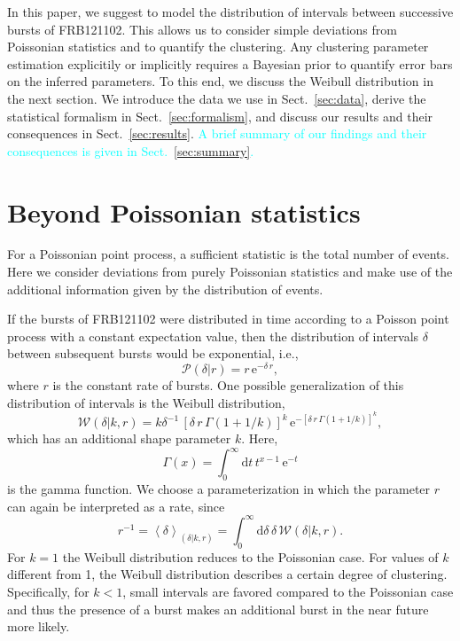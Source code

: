 \documentclass[fleqn,usenatbib]{mnras}
\newcommand{\new}[1]{\textcolor{cyan}{#1}}
\renewcommand{\d}{\delta}
\begin{document}
In this paper, we suggest to model the distribution of intervals between successive bursts of FRB121102. This allows us to consider simple deviations from Poissonian statistics and to quantify the clustering.  Any clustering parameter estimation explicitily or implicitly requires a Bayesian prior to quantify error bars on the inferred parameters.
To this end, we discuss the Weibull distribution in the next section. We introduce the data we use in Sect.~\ref{sec:data}, derive the statistical formalism in Sect.~\ref{sec:formalism}, and discuss our results and their consequences in Sect.~\ref{sec:results}. \new{A brief summary of our findings and their consequences is given in Sect.~\ref{sec:summary}.}


\section{Beyond Poissonian statistics}
\label{sec:weibull}

For a Poissonian point process, a sufficient statistic is the total number of events. Here we consider deviations from purely Poissonian statistics and make use of the additional information given by the distribution of events.

If the bursts of FRB121102 were distributed in time according to a Poisson point process with a constant expectation value, then the distribution of intervals $\d$ between subsequent bursts would be exponential, i.e.,
\begin{equation}
	\mathcal{P}(\d|r) = r\,\mathrm{e}^{-\d\,r},
\end{equation}
where $r$ is the constant rate of bursts. One possible generalization of this distribution of intervals is the Weibull distribution,
\begin{equation}
	\label{eq:weibull}
	\mathcal{W}(\d|k,r) = k\d^{-1} \, \left[\d \, r\, \Gamma\left(1 + 1/k\right)\right]^k \, \mathrm{e}^{-\left[\d \, r \, \Gamma\left(1 + 1/k\right)\right]^k},
\end{equation}
which has an additional shape parameter $k$. Here,
\begin{equation}
	\Gamma(x) = \int_0^\infty \mathrm{d}t \, t^{x - 1} \, \mathrm{e}^{-t}
\end{equation}
is the gamma function. We choose a parameterization in which the parameter $r$ can again be interpreted as a rate, since
\begin{equation}
	r^{-1} = \left<\d\right>_{(\d|k,r)} = \int_0^\infty \mathrm{d}\d \, \d \, \mathcal{W}(\d|k,r).
\end{equation}
For $k=1$ the Weibull distribution reduces to the Poissonian case. For values of $k$ different from 1, the Weibull distribution describes a certain degree of clustering. Specifically, for $k < 1$, small intervals are favored compared to the Poissonian case and thus the presence of a burst makes an additional burst in the near future more likely.
\end{document}
